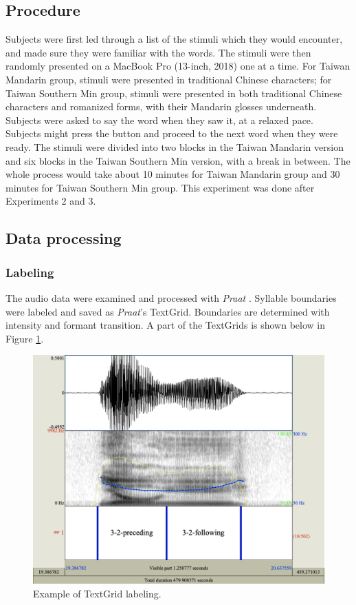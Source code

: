 \subsection{Procedure}
Subjects were first led through a list of the stimuli which they would encounter, and made sure they were familiar with the words. The stimuli were then randomly presented on a MacBook Pro (13-inch, 2018) one at a time. For Taiwan Mandarin group, stimuli were presented in traditional Chinese characters; for Taiwan Southern Min group, stimuli were presented in both traditional Chinese characters and romanized forms, with their Mandarin glosses underneath. Subjects were asked to say the word when they saw it, at a relaxed pace. Subjects might press the button and proceed to the next word when they were ready. The stimuli were divided into two blocks in the Taiwan Mandarin version and six blocks in the Taiwan Southern Min version, with a break in between. The whole process would take about 10 minutes for Taiwan Mandarin group and 30 minutes for Taiwan Southern Min group. This experiment was done after Experiments 2 and 3.

\subsection{Data processing}
\subsubsection{Labeling}
The audio data were examined and processed with \textit{Praat} \citep{BoersmaWeenink2018}. Syllable boundaries were labeled and saved as \textit{Praat}’s TextGrid. Boundaries are determined with intensity and formant transition. A part of the TextGrids is shown below in Figure \ref{Figure:TextGridExample}.

\begin{figure}[hbt!]
\centering
\includegraphics[width=\textwidth]{figures/E1/TextGridExample.jpg}
\caption{Example of TextGrid labeling.}
\label{Figure:TextGridExample}
\end{figure}

